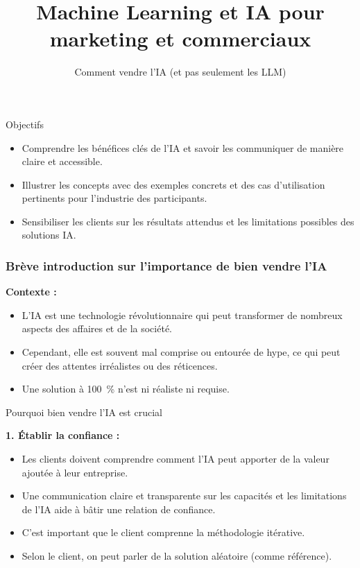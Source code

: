 
\title{Machine Learning et IA pour marketing et commerciaux}
\subtitle{Comment vendre l'IA (et pas seulement les LLM)}



\begin{frame}
  \titlepage
\end{frame}


\begin{frame}{Objectifs}
  \begin{itemize}
  \item Comprendre les bénéfices clés de l'IA et savoir les
    communiquer de manière claire et accessible.
  \item Illustrer les concepts avec des exemples concrets et des cas
    d'utilisation pertinents pour l'industrie des participants.
  \item Sensibiliser les clients sur les résultats attendus et les
    limitations possibles des solutions IA.
  \end{itemize}
\end{frame}

\begin{frame}
\frametitle{Brève introduction sur l'importance de bien vendre l'IA}

\textbf{Contexte :}
\begin{itemize}
\item L'IA est une technologie révolutionnaire qui peut transformer de
  nombreux aspects des affaires et de la société.
\item Cependant, elle est souvent mal comprise ou entourée de hype, ce
  qui peut créer des attentes irréalistes ou des réticences.
  \item Une solution à 100~\% n'est ni réaliste ni requise.
\end{itemize}
\end{frame}

\begin{frame}{Pourquoi bien vendre l'IA est crucial}

\textbf{1. Établir la confiance :}
\begin{itemize}
\item Les clients doivent comprendre comment l'IA peut apporter de la
  valeur ajoutée à leur entreprise.
    \item Une communication claire et transparente sur les capacités
      et les limitations de l'IA aide à bâtir une relation de
      confiance.
    \item C'est important que le client comprenne la méthodologie
      itérative.
    \item Selon le client, on peut parler de la solution aléatoire
      (comme référence).
\end{itemize}
\end{frame}

